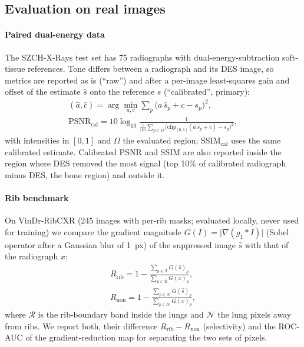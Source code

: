 \subsection{Evaluation on real images}
\paragraph{Paired dual-energy data} The SZCH-X-Rays test set has 75 radiographs with dual-energy-subtraction soft-tissue references.
Tone differs between a radiograph and its DES image, so metrics are reported as is (``raw'') and after a per-image least-squares gain and
offset of the estimate $\hat s$ onto the reference $s$ (``calibrated'', primary):
\begin{equation}
\begin{gathered}
(\hat a,\hat c)=\arg\min_{a,c}\sum_p\big(a\,\hat s_p+c-s_p\big)^2,\\
\mathrm{PSNR}_{\mathrm{cal}}=10\log_{10}\frac{1}{\frac{1}{|\Omega|}\sum_{p\in\Omega}\big(\mathrm{clip}_{[0,1]}(\hat a\,\hat s_p+\hat c)-s_p\big)^2},
\end{gathered}
\label{eq:psnrcal}
\end{equation}
with intensities in $[0,1]$ and $\Omega$ the evaluated region; SSIM$_{\mathrm{cal}}$ uses the same calibrated estimate. Calibrated PSNR and
SSIM are also reported inside the region where DES removed the most signal (top 10\% of calibrated radiograph minus DES, the bone region)
and outside it.
\paragraph{Rib benchmark} On VinDr-RibCXR (245 images with per-rib masks; evaluated locally, never used for training) we compare the
gradient magnitude $G(I)=\lvert\nabla(g_{1}*I)\rvert$ (Sobel operator after a Gaussian blur of 1~px) of the suppressed image $\hat s$ with that
of the radiograph $x$:
\begin{equation}
\begin{gathered}
R_{\mathrm{rib}}=1-\frac{\sum_{p\in\mathcal{R}}G(\hat s)_p}{\sum_{p\in\mathcal{R}}G(x)_p},\\
R_{\mathrm{non}}=1-\frac{\sum_{p\in\mathcal{N}}G(\hat s)_p}{\sum_{p\in\mathcal{N}}G(x)_p},
\end{gathered}
\label{eq:rib}
\end{equation}
where $\mathcal{R}$ is the rib-boundary band inside the lungs and $\mathcal{N}$ the lung pixels away from ribs. We report both, their
difference $R_{\mathrm{rib}}-R_{\mathrm{non}}$ (selectivity) and the ROC-AUC of the gradient-reduction map for separating the two sets of
pixels.
